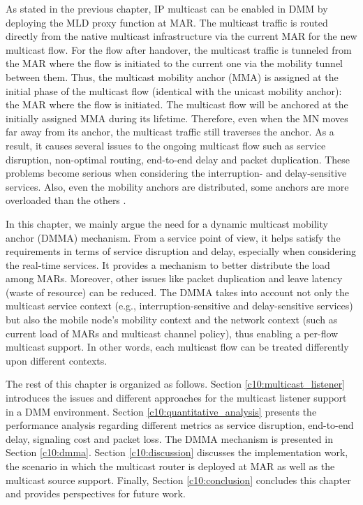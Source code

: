 As stated in the previous chapter, IP multicast can be enabled in DMM by deploying the MLD proxy function at MAR. The multicast traffic is routed directly from the native multicast infrastructure via the current MAR for the new multicast flow. For the flow after handover, the multicast traffic is tunneled from the MAR where the flow is initiated to the current one via the mobility tunnel between them. Thus, the multicast mobility anchor (MMA) is assigned at the initial phase of the multicast flow (identical with the unicast mobility anchor): the MAR where the flow is initiated. The multicast flow will be anchored at the initially assigned MMA during its lifetime. Therefore, even when the MN moves far away from its anchor, the multicast traffic still traverses the anchor. As a result, it causes several issues to the ongoing multicast flow such as service disruption, non-optimal routing, end-to-end delay and packet duplication. These problems become serious when considering the interruption- and delay-sensitive services. Also, even the mobility anchors are distributed, some anchors are more overloaded than the others \cite{anchor_selection}.

In this chapter, we mainly argue the need for a dynamic multicast mobility anchor (DMMA) mechanism. From a service point of view, it helps satisfy the requirements in terms of service disruption and delay, especially when considering the real-time services. It provides a mechanism to better distribute the load among MARs. Moreover, other issues like packet duplication and leave latency (waste of resource) can be reduced. The DMMA takes into account not only the multicast service context (e.g., interruption-sensitive and delay-sensitive services) but also the mobile node's mobility context and the network context (such as current load of MARs and multicast channel policy), thus enabling a per-flow multicast support. In other words, each multicast flow can be treated differently upon different contexts. 

The rest of this chapter is organized as follows. Section \ref{c10:multicast_listener} introduces the issues and different approaches for the multicast listener support in a DMM environment. Section \ref{c10:quantitative_analysis} presents the performance analysis regarding different metrics as service disruption, end-to-end delay, signaling cost and packet loss. The DMMA mechanism is presented in Section \ref{c10:dmma}. Section \ref{c10:discussion} discusses the implementation work, the scenario in which the multicast router is deployed at MAR as well as the multicast source support. Finally, Section \ref{c10:conclusion} concludes this chapter and provides perspectives for future work. 

